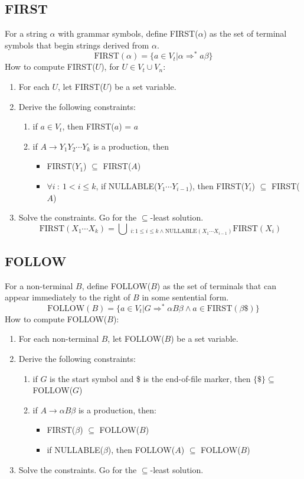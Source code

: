 \documentclass[10pt]{article}
\begin{document}
\subsection*{FIRST}
For a string $\alpha$ with grammar symbols, define FIRST($\alpha$) as the set of terminal symbols that begin strings derived from $\alpha$.
\[\text{FIRST}(\alpha) = \{a \in V_t \vert \alpha \Rightarrow ^* a\beta\}\]
How to compute FIRST($U$), for $U \in V_t \cup V_n$:
\begin{enumerate}
    \item For each $U$, let FIRST($U$) be a set variable.
    \item Derive the following constraints:
    \begin{enumerate}
        \item if $a \in V_t$, then FIRST($a$) = { $a$ }
        \item if $A \rightarrow Y_1Y_2\cdots Y_k$ is a production, then 
            \begin{itemize}
                \item FIRST($Y_1$) $\subseteq$ FIRST($A$)
                \item $\forall i \::\: 1 < i \leq k$, if NULLABLE($Y_1\cdots Y_{i - 1}$), then FIRST($Y_i$) $\subseteq$ FIRST($A$)
            \end{itemize}
    \end{enumerate}
    \item Solve the constraints.  Go for the $\subseteq$-least solution.
    \[\text{FIRST}(X_1\cdots X_k) = \bigcup \:_{i:1\leq i \leq k \land \text{NULLABLE}(X_1\cdots X_{i - 1})}\text{FIRST}(X_i)\]
\end{enumerate}

\subsection*{FOLLOW}
For a non-terminal $B$, define FOLLOW($B$) as the set of terminals that can appear immediately to the right of $B$ in some sentential form.
\[\text{FOLLOW}(B) = \{a \in V_t \vert G \Rightarrow^* \alpha B \beta \land a \in \text{FIRST}(\beta \$)\}\]
How to compute FOLLOW($B$):
\begin{enumerate}
    \item For each non-terminal $B$, let FOLLOW($B$) be a set variable.
    \item Derive the following constraints:
    \begin{enumerate}
        \item if $G$ is the start symbol and \$ is the end-of-file marker, then $\{\$\} \subseteq$ FOLLOW($G$)
        \item if $A \rightarrow \alpha B \beta$ is a production, then:
        \begin{itemize}
            \item FIRST($\beta$) $\subseteq$ FOLLOW($B$)
            \item if NULLABLE($\beta$), then FOLLOW($A$) $\subseteq$ FOLLOW($B$)
        \end{itemize}
    \end{enumerate}
    \item Solve the constraints.  Go for the $\subseteq$-least solution.
\end{enumerate}
\end{document}
